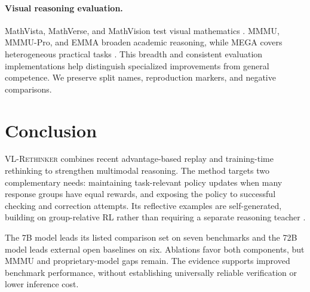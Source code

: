 \documentclass[twocolumn]{article}
\newcommand{\model}{\textsc{VL-Rethinker}\xspace}
\begin{document}
\paragraph{Visual reasoning evaluation.}
MathVista, MathVerse, and MathVision test visual mathematics \citep{mathvista,mathverse,mathvision}. MMMU, MMMU-Pro, and EMMA broaden academic reasoning, while MEGA covers heterogeneous practical tasks \citep{yue2024mmmu,mmmupro,emma,chen2024mega}. This breadth and consistent evaluation implementations \citep{zhang2024lmmsevalrealitycheckevaluation} help distinguish specialized improvements from general competence. We preserve split names, reproduction markers, and negative comparisons.

\section{Conclusion}
\label{sec:conclusion}

\model combines recent advantage-based replay and training-time rethinking to strengthen multimodal reasoning. The method targets two complementary needs: maintaining task-relevant policy updates when many response groups have equal rewards, and exposing the policy to successful checking and correction attempts. Its reflective examples are self-generated, building on group-relative RL rather than requiring a separate reasoning teacher \citep{deepseek-r1,per}.

The 7B model leads its listed comparison set on seven benchmarks and the 72B model leads external open baselines on six. Ablations favor both components, but MMMU and proprietary-model gaps remain. The evidence supports improved benchmark performance, without establishing universally reliable verification or lower inference cost.

\begingroup
\small
\setlength{\bibsep}{2pt}


\endgroup
\end{document}
